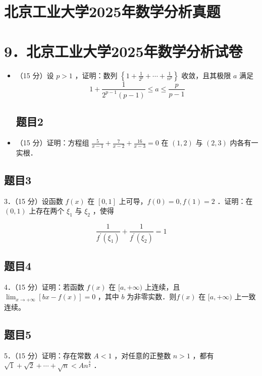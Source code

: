 \documentclass{article}
\begin{document}
\section*{北京工业大学2025年数学分析真题}
\section*{9．北京工业大学2025年数学分析试卷}
\begin{itemize}

\subsection{题目1}
  \item[1．] （15 分）设 \(p>1\) ，证明：数列 \(\left\{1+\frac{1}{2^{p}}+\cdots+\frac{1}{n^{p}}\right\}\) 收敛，且其极限 \(a\) 满足
\[
1+\frac{1}{2^{p-1}(p-1)} \leq a \leq \frac{p}{p-1}
\]

\subsection{题目2}
  \item[2．] （15 分）证明：方程组 \(\frac{5}{x-1}+\frac{7}{x-2}+\frac{16}{x-3}=0\) 在 \((1,2)\) 与 \((2,3)\) 内各有一实根．
\end{itemize}

\subsection{题目3}
3．（15 分）设函数 \(f(x)\) 在 \([0,1]\) 上可导，\(f(0)=0, f(1)=2\) ．证明：在 \((0,1)\) 上存在两个 \(\xi_{1}\) 与 \(\xi_{2}\) ，使得

\[
\frac{1}{f^{\prime}\left(\xi_{1}\right)}+\frac{1}{f^{\prime}\left(\xi_{2}\right)}=1
\]

\subsection{题目4}
4．（15 分）证明：若函数 \(f(x)\) 在 \([a,+\infty)\) 上连续，且 \(\lim _{x \rightarrow+\infty}[b x-f(x)]=0\) ，其中 \(b\) 为非零实数．则\(f(x)\) 在 \([a,+\infty)\) 上一致连续。

\subsection{题目5}
5．（15 分）证明：存在常数 \(A<1\) ，对任意的正整数 \(n>1\) ，都有 \(\sqrt{1}+\sqrt{2}+\cdots+\sqrt{n}<A n^{\frac{3}{2}}\) ．
\end{document}
